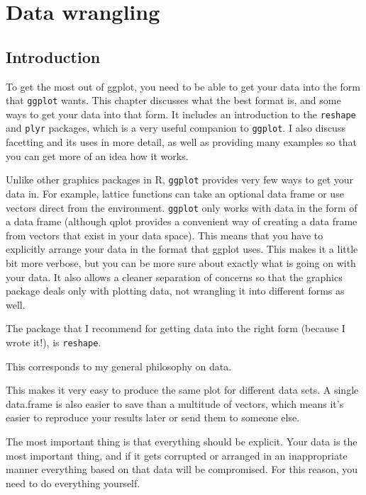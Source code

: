 

\chapter{Data wrangling}

\section{Introduction}\label{sec:introduction}

To get the most out of ggplot, you need to be able to get your data into the form that {\tt ggplot} wants.  This chapter discusses what the best format is, and some ways to get your data into that form.  It includes an introduction to the {\tt reshape} and {\tt plyr} packages, which is a very useful companion to {\tt ggplot}.  I also discuss facetting and its uses in more detail, as well as providing many examples so that you can get more of an idea how it works.

Unlike other graphics packages in R, {\tt ggplot} provides very few ways to get your data in.  For example, lattice functions can take an optional data frame or use vectors direct from the environment.  {\tt ggplot} only works with data in the form of a data frame (although qplot provides a convenient way of creating a data frame from vectors that exist in your data space).  This means that you have to explicitly arrange your data in the format that ggplot uses.  This makes it a little bit more verbose, but you can be more sure about exactly what is going on with your data.  It also allows a cleaner separation of concerns so that the graphics package deals only with plotting data, not wrangling it into different forms as well.

The package that I recommend for getting data into the right form (because I wrote it!), is {\tt reshape}.

This corresponds to my general philosophy on data.  

This makes it very easy to produce the same plot for different data sets.  A single data.frame is also easier to save than a multitude of vectors, which means it's easier to reproduce your results later or send them to someone else.  

The most important thing is that everything should be explicit.  Your data is the most important thing, and if it gets corrupted or arranged in an inappropriate manner everything based on that data will be compromised.  For this reason, you need to do everything yourself.

